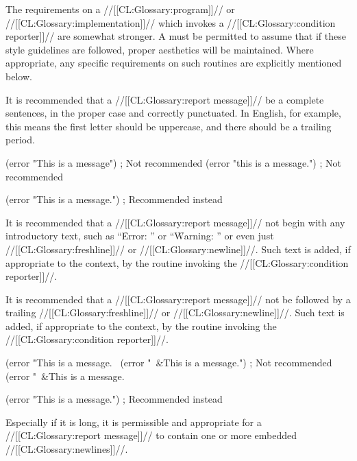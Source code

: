 The requirements on a //[[CL:Glossary:program]]// or //[[CL:Glossary:implementation]]// which
invokes a //[[CL:Glossary:condition reporter]]// are somewhat stronger.  A  must be permitted to assume that if these style guidelines are
followed, proper aesthetics will be maintained.  Where appropriate, any
specific requirements on such routines are explicitly mentioned below.


It is recommended that a //[[CL:Glossary:report message]]// be a complete sentences, in the
proper case and correctly punctuated.  In English, for example, this
means the first letter should be uppercase, and there should be a
trailing period.

\code
 (error "This is a message")  ; Not recommended
 (error "this is a message.") ; Not recommended

 (error "This is a message.") ; Recommended instead
\endcode

\endsubsubsubsection%


It is recommended that a //[[CL:Glossary:report message]]// not begin with any 
introductory text, such as ``\f{Error: }'' or ``\f{Warning: }''
or even just //[[CL:Glossary:freshline]]// or //[[CL:Glossary:newline]]//. 
Such text is added, if appropriate to the context,
by the routine invoking the //[[CL:Glossary:condition reporter]]//.

It is recommended that a //[[CL:Glossary:report message]]// not be followed 
by a trailing //[[CL:Glossary:freshline]]// or //[[CL:Glossary:newline]]//.
Such text is added, if appropriate to the context, 
by the routine invoking the //[[CL:Glossary:condition reporter]]//.

\code
 (error "This is a message.~%
 (error "~&This is a message.")   ; Not recommended
 (error "~&This is a message.~%

 (error "This is a message.")     ; Recommended instead
\endcode

\endsubsubsubsection%


Especially if it is long, it is permissible and appropriate for 
a //[[CL:Glossary:report message]]// to contain one or more embedded //[[CL:Glossary:newlines]]//.

